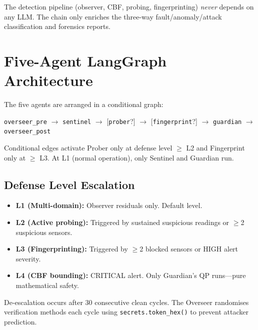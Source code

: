 \documentclass[journal]{IEEEtran}
\begin{document}
The detection pipeline (observer, CBF, probing, fingerprinting) \emph{never} depends on any LLM. The chain only enriches the three-way fault/anomaly/attack classification and forensics reports.


\section{Five-Agent LangGraph Architecture}
\label{sec:agents}

The five agents are arranged in a conditional graph:

\begin{center}
\texttt{overseer\_pre} $\to$ \texttt{sentinel} $\to$ [\texttt{prober}?] $\to$ [\texttt{fingerprint}?] $\to$ \texttt{guardian} $\to$ \texttt{overseer\_post}
\end{center}

Conditional edges activate Prober only at defense level $\ge$ L2 and Fingerprint only at $\ge$ L3. At L1 (normal operation), only Sentinel and Guardian run.

\subsection{Defense Level Escalation}

\begin{itemize}[leftmargin=*]
\item \textbf{L1 (Multi-domain):} Observer residuals only. Default level.
\item \textbf{L2 (Active probing):} Triggered by sustained suspicious readings or $\ge$2 suspicious sensors.
\item \textbf{L3 (Fingerprinting):} Triggered by $\ge$2 blocked sensors or HIGH alert severity.
\item \textbf{L4 (CBF bounding):} CRITICAL alert. Only Guardian's QP runs---pure mathematical safety.
\end{itemize}

De-escalation occurs after 30 consecutive clean cycles. The Overseer randomises verification methods each cycle using \texttt{secrets.token\_hex()} to prevent attacker prediction.


\end{document}
